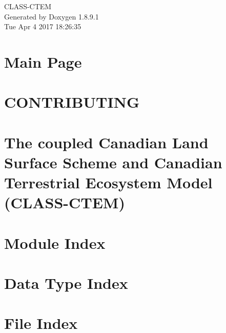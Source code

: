 \documentclass[twoside]{book}
\newcommand{\+}{\discretionary{\mbox{\scriptsize$\hookleftarrow$}}{}{}}
\newcommand{\clearemptydoublepage}{%
  \newpage{\pagestyle{empty}\cleardoublepage}%
}
\begin{document}
\hypersetup{pageanchor=false,
             bookmarks=true,
             bookmarksnumbered=true,
             pdfencoding=unicode
            }
\begin{titlepage}
\vspace*{7cm}
\begin{center}%
{\Large C\+L\+A\+S\+S-\/\+C\+T\+E\+M }\\
\vspace*{1cm}
{\large Generated by Doxygen 1.8.9.1}\\
\vspace*{0.5cm}
{\small Tue Apr 4 2017 18:26:35}\\
\end{center}
\end{titlepage}
\clearemptydoublepage
\tableofcontents
\clearemptydoublepage
{}
\hypersetup{pageanchor=true}

\chapter{Main Page}
\label{index}\hypertarget{index}{}
\chapter{C\+O\+N\+T\+R\+I\+B\+U\+T\+I\+N\+G}
\label{md_CONTRIBUTING}
\hypertarget{md_CONTRIBUTING}{}

\chapter{The coupled Canadian Land Surface Scheme and Canadian Terrestrial Ecosystem Model (C\+L\+A\+S\+S-\/\+C\+T\+E\+M)}
\label{md_README}
\hypertarget{md_README}{}

\chapter{Module Index}

\chapter{Data Type Index}

\chapter{File Index}

\end{document}
